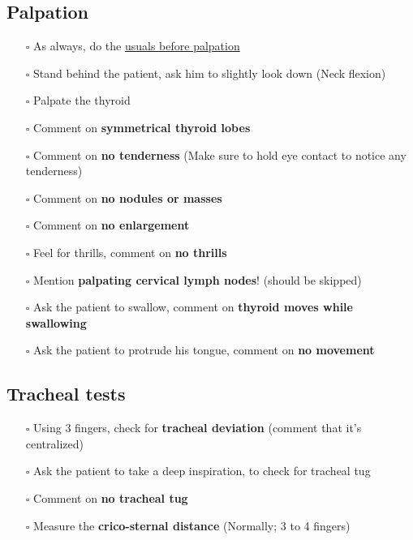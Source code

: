\documentclass[
  13.5pt,
  a4paper,
  DIV=11,
  numbers=noendperiod]{scrreprt}
\providecommand{\tightlist}{%
  \setlength{\itemsep}{0pt}\setlength{\parskip}{0pt}}
\begin{document}
\subsection{Palpation}\label{palpation-3}

\begin{itemize}
\tightlist
\item[$\square$]
  As always, do the \href{miscellaneous.qmd}{usuals before palpation}
\item[$\square$]
  Stand behind the patient, ask him to slightly look down (Neck flexion)
\item[$\square$]
  Palpate the thyroid
\item[$\square$]
  Comment on \textbf{symmetrical thyroid lobes}
\item[$\square$]
  Comment on \textbf{no tenderness} (Make sure to hold eye contact to
  notice any tenderness)
\item[$\square$]
  Comment on \textbf{no nodules or masses}
\item[$\square$]
  Comment on \textbf{no enlargement}
\item[$\square$]
  Feel for thrills, comment on \textbf{no thrills}
\item[$\square$]
  Mention \textbf{palpating cervical lymph nodes}! (should be skipped)
\item[$\square$]
  Ask the patient to swallow, comment on \textbf{thyroid moves while
  swallowing}
\item[$\square$]
  Ask the patient to protrude his tongue, comment on \textbf{no
  movement}
\end{itemize}

\subsection{Tracheal tests}\label{tracheal-tests}

\begin{itemize}
\tightlist
\item[$\square$]
  Using 3 fingers, check for \textbf{tracheal deviation} (comment that
  it's centralized)
\item[$\square$]
  Ask the patient to take a deep inspiration, to check for tracheal tug
\item[$\square$]
  Comment on \textbf{no tracheal tug}
\item[$\square$]
  Measure the \textbf{crico-sternal distance} (Normally; 3 to 4 fingers)
\end{itemize}
\end{document}
